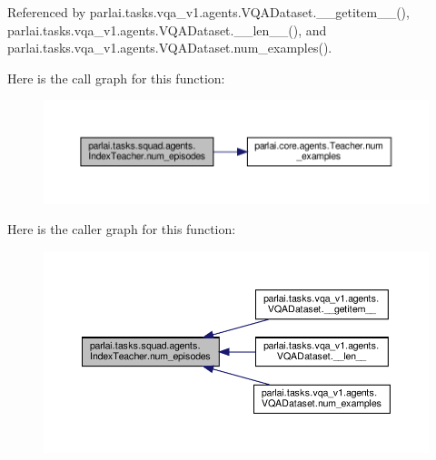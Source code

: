 Referenced by parlai.\+tasks.\+vqa\+\_\+v1.\+agents.\+V\+Q\+A\+Dataset.\+\_\+\+\_\+getitem\+\_\+\+\_\+(), parlai.\+tasks.\+vqa\+\_\+v1.\+agents.\+V\+Q\+A\+Dataset.\+\_\+\+\_\+len\+\_\+\+\_\+(), and parlai.\+tasks.\+vqa\+\_\+v1.\+agents.\+V\+Q\+A\+Dataset.\+num\+\_\+examples().

Here is the call graph for this function\+:
\nopagebreak
\begin{figure}[H]
\begin{center}
\leavevmode
\includegraphics[width=350pt]{classparlai_1_1tasks_1_1squad_1_1agents_1_1IndexTeacher_aeab5882318ba27f0ff15a0bc649fff0b_cgraph}
\end{center}
\end{figure}
Here is the caller graph for this function\+:
\nopagebreak
\begin{figure}[H]
\begin{center}
\leavevmode
\includegraphics[width=350pt]{classparlai_1_1tasks_1_1squad_1_1agents_1_1IndexTeacher_aeab5882318ba27f0ff15a0bc649fff0b_icgraph}
\end{center}
\end{figure}
\mbox{\label{classparlai_1_1tasks_1_1squad_1_1agents_1_1IndexTeacher_aab4a3c33e57bbf8e642668d7cd864eeb}} 
